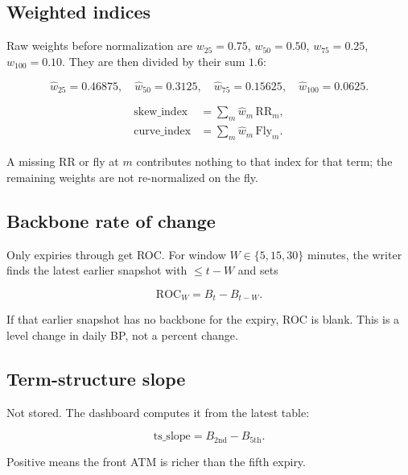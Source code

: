 \documentclass[11pt]{article}
\newcommand{\code}[1]{\texttt{\detokenize{#1}}}
\begin{document}
\subsection{Weighted indices}

Raw weights before normalization are
\(w_{25}=0.75\), \(w_{50}=0.50\), \(w_{75}=0.25\),
\(w_{100}=0.10\).  They are then divided by their sum \(1.6\):

\begin{equation}
\hat w_{25}=0.46875,\quad
\hat w_{50}=0.3125,\quad
\hat w_{75}=0.15625,\quad
\hat w_{100}=0.0625.
\end{equation}

\begin{align}
\mathrm{skew\_index}
&=
\sum_m \hat w_m\,\mathrm{RR}_m,\\
\mathrm{curve\_index}
&=
\sum_m \hat w_m\,\mathrm{Fly}_m.
\end{align}

A missing RR or fly at \(m\) contributes nothing to that index for
that term; the remaining weights are not re-normalized on the fly.

\subsection{Backbone rate of change}

Only expiries \code{2nd} through \code{5th} get ROC.
For window \(W\in\{5,15,30\}\) minutes, the writer finds the latest
earlier snapshot with \code{file_mtime} \(\le t-W\) and sets

\begin{equation}
\mathrm{ROC}_W
=
B_t-B_{t-W}.
\end{equation}

If that earlier snapshot has no backbone for the expiry, ROC is
blank.  This is a level change in daily BP, not a percent change.

\subsection{Term-structure slope}

Not stored.  The dashboard computes it from the latest table:

\begin{equation}
\mathrm{ts\_slope}
=
B_{2\mathrm{nd}}-B_{5\mathrm{th}}.
\end{equation}

Positive means the front ATM is richer than the fifth expiry.
\end{document}
